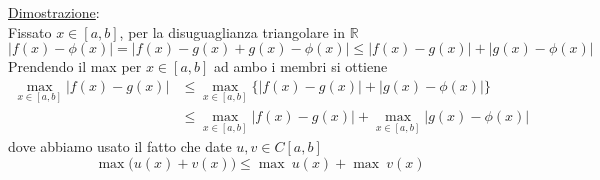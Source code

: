 \documentclass[12pt,a4paper]{article}
\begin{document}
\underline{Dimostrazione}:\\
Fissato $x\in [a,b]$, per la disuguaglianza triangolare in $\mathbb{R}$
\[
| f(x) - \phi(x) | = | f(x) - g(x) + g(x) - \phi(x) | \leq | f(x) - g(x) | + | g(x) - \phi(x) |
\]
Prendendo il max per $x \in [a,b]$ ad ambo i membri si ottiene
\[ \begin{split}
\underset{x \in [a,b]}{\max} |f(x)-g(x)| & \leq \underset{x \in [a,b]}{\max} \{ |f(x)-g(x)| + |g(x)-\phi(x)| \} \\
& \leq \underset{x \in [a,b]}{\max} |f(x)-g(x)|+ \underset{x \in [a,b]}{\max} |g(x)-\phi(x)|
\end{split} \]
dove abbiamo usato il fatto che date $u,v \in C[a,b]$
\[
\max\Big( u(x)+v(x) \Big) \leq \max \ u(x) + \max \ v(x)
\]
\end{document}
